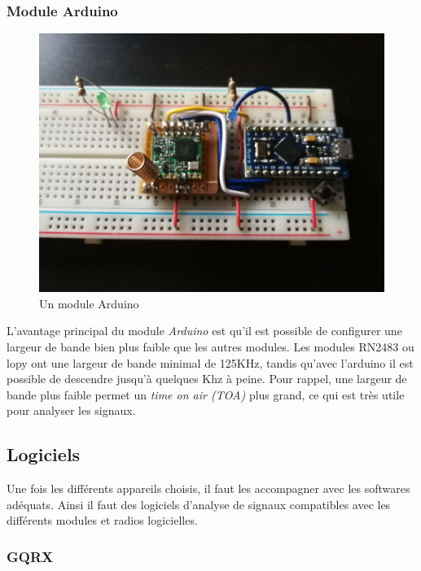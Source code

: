 \subsubsection{Module Arduino}\label{arduino}

\begin{figure}[h]
\centering

\includegraphics[scale=0.08]{images/arduino.png}
\caption{Un module Arduino}\label{term36}
\end{figure}

L'avantage principal du module \textit{Arduino} est qu'il est possible de configurer une largeur de bande bien plus faible que les autres modules. Les modules RN2483 ou lopy ont une largeur de bande minimal de 125KHz, tandis qu'avec l'arduino il est possible de descendre jusqu'à quelques Khz à peine. Pour rappel, une largeur de bande plus faible permet un \textit{time on air (TOA)} plus grand, ce qui est très utile pour analyser les signaux. 

\subsection{Logiciels}\label{fft}

Une fois les différents appareils choisis, il faut les accompagner avec les softwares adéquats. Ainsi il faut des logiciels d'analyse de signaux compatibles avec les différents modules et radios logicielles.

\subsubsection{GQRX}

